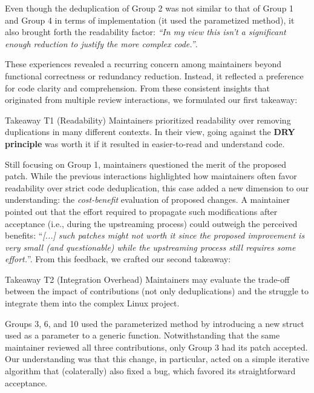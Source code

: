\documentclass[10pt,conference]{IEEEtran}
\newenvironment{highlight-box}[1]{%
  \begin{tcolorbox}[colback=gray!10, colframe=gray!50!black, boxrule=0.5pt,
                    left=1mm, right=1mm, top=1mm, bottom=1mm, sharp corners]
  \textbf{#1:} \itshape}{\end{tcolorbox}}
\begin{document}
Even though the deduplication of Group 2 was not similar to that of Group 1 and Group 4 in terms of implementation (it used the parametized method), it also brought forth the readability factor: \textit{``In my view this isn't a significant enough reduction to justify the more complex code.''}.

These experiences revealed a recurring concern among maintainers beyond functional correctness or redundancy reduction. Instead, it reflected a preference for code clarity and comprehension. From these consistent insights that originated from multiple review interactions, we formulated our first takeaway:

\begin{highlight-box}{Takeaway T1 (Readability)}
Maintainers prioritized readability over removing duplications in many different contexts. In their view, going against the \textbf{DRY principle} was worth it if it resulted in easier-to-read and understand code.
\end{highlight-box}

Still focusing on Group 1, maintainers questioned the merit of the proposed patch. While the previous interactions highlighted how maintainers often favor readability over strict code deduplication, this case added a new dimension to our understanding: the \textit{cost-benefit} evaluation of proposed changes. A maintainer pointed out that the effort required to propagate such modifications after acceptance (i.e., during the upstreaming process) could outweigh the perceived benefits: ``\textit{[...] such patches might not worth it since the proposed improvement is very small (and questionable) while the upstreaming process still requires some effort.}''. From this feedback, we crafted our second takeaway:

\begin{highlight-box}{Takeaway T2 (Integration Overhead)}
Maintainers may evaluate the trade-off between the impact of contributions
(not only deduplications) and the struggle to integrate them into the complex
Linux project.
\end{highlight-box}

Groups 3, 6, and 10 used the parameterized method by introducing a new struct used as a parameter to a generic function. Notwithstanding that the same maintainer reviewed all three contributions, only Group 3 had its patch accepted. Our understanding was that this change, in particular, acted on a simple iterative algorithm that (colaterally) also fixed a bug, which favored its straightforward acceptance.
\end{document}
